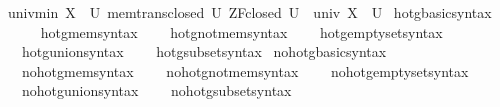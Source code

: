 \begin{isabellebody}
\ \ univ{\isacharunderscore}{\kern0pt}min{\isacharcolon}{\kern0pt}\ {\isachardoublequoteopen}{\isasymlbrakk}X\ {\isasymin}\ U{\isacharsemicolon}{\kern0pt}\ mem{\isacharunderscore}{\kern0pt}trans{\isacharunderscore}{\kern0pt}closed\ U{\isacharsemicolon}{\kern0pt}\ ZF{\isacharunderscore}{\kern0pt}closed\ U{\isasymrbrakk}\ {\isasymLongrightarrow}\ univ\ X\ {\isasymsubseteq}\ U{\isachardoublequoteclose}\isanewline
\isanewline
\isanewline
{}\isamarkupfalse%
\ hotg{\isacharunderscore}{\kern0pt}basic{\isacharunderscore}{\kern0pt}syntax\isanewline
{}\isanewline
\ \ \isamarkupfalse%
\isanewline
\ \ \ \ hotg{\isacharunderscore}{\kern0pt}mem{\isacharunderscore}{\kern0pt}syntax\isanewline
\ \ \ \ hotg{\isacharunderscore}{\kern0pt}not{\isacharunderscore}{\kern0pt}mem{\isacharunderscore}{\kern0pt}syntax\isanewline
\ \ \ \ hotg{\isacharunderscore}{\kern0pt}emptyset{\isacharunderscore}{\kern0pt}syntax\isanewline
\ \ \ \ hotg{\isacharunderscore}{\kern0pt}union{\isacharunderscore}{\kern0pt}syntax\isanewline
\ \ \ \ hotg{\isacharunderscore}{\kern0pt}subset{\isacharunderscore}{\kern0pt}syntax\isanewline
{}\isamarkupfalse%
\isanewline
{}\isamarkupfalse%
\ no{\isacharunderscore}{\kern0pt}hotg{\isacharunderscore}{\kern0pt}basic{\isacharunderscore}{\kern0pt}syntax\isanewline
{}\isanewline
\ \ \isamarkupfalse%
\isanewline
\ \ \ \ no{\isacharunderscore}{\kern0pt}hotg{\isacharunderscore}{\kern0pt}mem{\isacharunderscore}{\kern0pt}syntax\isanewline
\ \ \ \ no{\isacharunderscore}{\kern0pt}hotg{\isacharunderscore}{\kern0pt}not{\isacharunderscore}{\kern0pt}mem{\isacharunderscore}{\kern0pt}syntax\isanewline
\ \ \ \ no{\isacharunderscore}{\kern0pt}hotg{\isacharunderscore}{\kern0pt}emptyset{\isacharunderscore}{\kern0pt}syntax\isanewline
\ \ \ \ no{\isacharunderscore}{\kern0pt}hotg{\isacharunderscore}{\kern0pt}union{\isacharunderscore}{\kern0pt}syntax\isanewline
\ \ \ \ no{\isacharunderscore}{\kern0pt}hotg{\isacharunderscore}{\kern0pt}subset{\isacharunderscore}{\kern0pt}syntax\isanewline
{}\isamarkupfalse%
\isanewline
%
\isadelimtheory
\isanewline
%
\endisadelimtheory
%
\isatagtheory
{}\isamarkupfalse%
%
\endisatagtheory
{\isafoldtheory}%
%
\isadelimtheory
%
\endisadelimtheory
%
\end{isabellebody}%
\endinput
